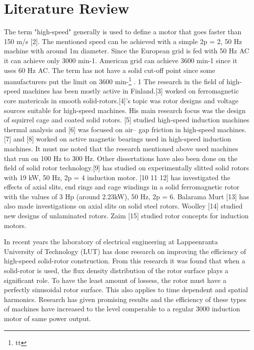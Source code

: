 %

\chapter{Literature Review} %
 

The term "high-speed" generally is used to define a motor that goes faster than 150 m/s
[2]. The mentioned speed can be achieved with a simple 2p = 2, 50 Hz machine with
around 1m diameter. Since the European grid is fed with 50 Hz AC it can achieve
only 3000 min-1. American grid can achieve 3600 min-1 since it uses 60 Hz AC. The
term has not have a solid cut-off point since some manufacturers put the limit on
3600 min-\footnote[2]{tt}
.       
1
The research in the field of high-speed machines has been mostly active in
Finland.[3] worked on ferromagnetic core matericals in smooth solid-rotors.[4]'s
topic was rotor designs and voltage sources suitable for high-speed machines. His
main research focus was the design of squirrel cage and coated solid rotors. [5]
studied high-speed induction machines thermal analysis and [6] was focused on air–
gap friction in high-speed machines.[7] and [8] worked on active magnetic bearings
used in high-speed induction machines. It must me noted that the research mentioned
above used machines that run on 100 Hz to 300 Hz.
Other dissertations have also been done on the field of solid rotor 
technology.[9] has studied on experimentally slitted solid rotors with 19 kW, 50 Hz,
2p = 4 induction motor. [10 11 12] has investigated the effects of axial slits, end
rings and cage windings in a solid ferromagnetic rotor with the values of 3 Hp
(around 2.23kW), 50 Hz, 2p = 6. Balarama Murt [13] has also made investigations
on axial slits on solid steel rotors. Woolley [14] studied new designs of unlaminated
rotors. Zaim [15] studied rotor concepts for induction motors.

In recent years the laboratory of electrical engineering at Lappeenranta University of
Technology (LUT) has done research on improving the efficiency of high-speed
solid-rotor construction. From this research it was found that when a solid-rotor is
used, the flux density distribution of the rotor surface plays a significant role. To
have the least amount of lossess, the rotor must have a perfectly sinusoidal rotor
surface. This also applies to time dependent and spatial harmonics. Research has
given promising results and the efficiency of these types of machines have increased
to the level comperable to a regular 3000 induction motor of same power
output.



